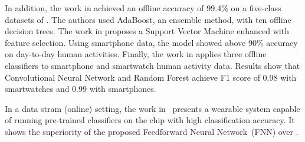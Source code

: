 In addition, the work in \cite{ugulino2012} achieved an offline accuracy of
99.4\% on a five-class datasets of \har. The authors used AdaBoost, an
ensemble method, with ten offline decision trees. The work in
\cite{ahmed2019smartphone} proposes a Support Vector Machine enhanced with
feature selection. Using smartphone data, the model showed above 90\%
accuracy on day-to-day human activities. Finally, the work in
\cite{san2018robust} applies three offline classifiers to smartphone and
smartwatch human activity data. Results show that Convolutional Neural Network and Random
Forest achieve F1 score of 0.98 with smartwatches and 0.99 with
smartphones.

In a data stram (online) setting, the work in~\cite{omid_2019} presents a wearable
system capable of running pre-trained classifiers on the chip with high classification
accuracy. It shows the superiority of the proposed Feedforward Neural
Network~(FNN) over \knn.










